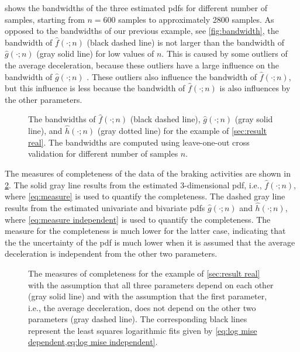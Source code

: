  shows the bandwidths of the three estimated pdfs for different number of samples, starting from $n=600$ samples to approximately 2800 samples. As opposed to the bandwidths of our previous example, see \cref{fig:bandwidth}, the bandwidth of $\hat{f}(\cdot;n)$ (black dashed line) is not larger than the bandwidth of $\hat{g}(\cdot;n)$ (gray solid line) for low values of $n$. This is caused by some outliers of the average deceleration, because these outliers have a large influence on the bandwidth of $\hat{g}(\cdot;n)$ \cite{hall1992global}. These outliers also influence the bandwidth of $\hat{f}(\cdot;n)$, but this influence is less because the bandwidth of $\hat{f}(\cdot;n)$ is also influences by the other parameters.

\setlength{}
\setlength{}
\begin{figure}
	\centering
	
	\caption{The bandwidths of $\hat{f}(\cdot;n)$ (black dashed line), $\hat{g}(\cdot;n)$ (gray solid line), and $\hat{h}(\cdot;n)$ (gray dotted line) for the example of \cref{sec:result real}. The bandwidths are computed using leave-one-out cross validation for different number of samples $n$.}
	\label{fig:bandwidth real}
\end{figure}

The measures of completeness of the data of the braking activities are shown in \cref{fig:mise real}. The solid gray line results from the estimated 3-dimensional pdf, i.e., $\hat{f}(\cdot;n)$, where \cref{eq:measure} is used to quantify the completeness. The dashed gray line results from the estimated univariate and bivariate pdfs $\hat{g}(\cdot;n)$ and $\hat{h}(\cdot;n)$, where \cref{eq:measure independent} is used to quantify the completeness. The measure for the completeness is much lower for the latter case, indicating that the the uncertainty of the pdf is much lower when it is assumed that the average deceleration is independent from the other two parameters.

\setlength{}
\setlength\figureheight{\linewidth}
\begin{figure}
	\centering
	
	\caption{The measures of completeness for the example of \cref{sec:result real} with the assumption that all three parameters depend on each other (gray solid line) and with the assumption that the first parameter, i.e., the average deceleration, does not depend on the other two parameters (gray dashed line). The corresponding black lines represent the least squares logarithmic fits given by \cref{eq:log mise dependent,eq:log mise independent}.}
	\label{fig:mise real}
\end{figure}

